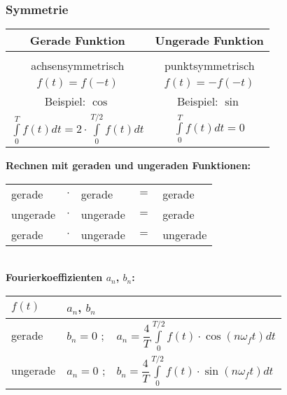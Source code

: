 		\subsubsection{Symmetrie}
			\begin{minipage}[]{0.5\textwidth}
				\begin{tabular}{|c|c|}
					\hline
					\textbf{Gerade Funktion} & \textbf{Ungerade Funktion}\\[3pt]
					\hline
					\scalebox{0.45}{} & \scalebox{0.45}{}\\[3pt]
					\hline
					achsensymmetrisch & punktsymmetrisch\\[3pt]
					$\displaystyle f(t) = f(-t)$ & $f(t) = -f(-t)$\\[3pt]
					\hline
					Beispiel: $\displaystyle \cos$ & Beispiel: $\sin$\\[3pt]
					\hline
					$\displaystyle \int\limits_{0}^{T} f(t) dt = 2 \cdot \int\limits_{0}^{T/2} f(t) dt$ & $\displaystyle \int\limits_{0}^{T} f(t) dt = 0$\\[3pt]
					\hline
				\end{tabular}
			\end{minipage}
			\begin{minipage}[]{0.5\textwidth}
				\textbf{Rechnen mit geraden und ungeraden Funktionen:}\\[3pt]
				\begin{tabular}{|lclcl|}
					\hline
					gerade & $\cdot$ & gerade & $=$ & gerade\\[3pt]
					ungerade & $\cdot$ & ungerade & $=$ & gerade\\[3pt]
					gerade & $\cdot$ & ungerade & $=$ & ungerade\\[3pt]
					\hline
				\end{tabular}\\[3pt]
				\textbf{Fourierkoeffizienten $a_n$, $b_n$:}\\[3pt]
				\begin{tabular}{|l|ll|}
					\hline
					$f(t)$		&  $a_n$, $b_n$ & \\[3pt]
					\hline
					gerade		& $b_n = 0$ ; & $\displaystyle a_n = \dfrac{4}{T} \int\limits_{0}^{T/2} f(t) \cdot \cos(n \omega_f t) dt$\\[3pt]
					\hline
					ungerade	& $a_n = 0$ ; & $\displaystyle b_n = \dfrac{4}{T} \int\limits_{0}^{T/2} f(t) \cdot \sin(n \omega_f t) dt$\\[3pt]
					\hline
				\end{tabular}
			\end{minipage}
